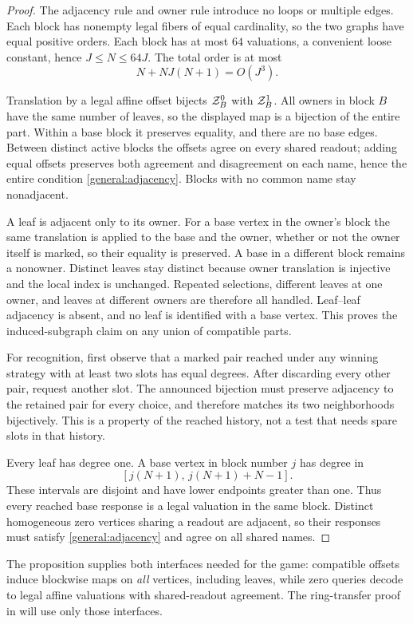 \begin{proof}
The adjacency rule and owner rule introduce no loops or multiple
edges. Each block has nonempty legal fibers of equal cardinality,
so the two graphs have equal positive orders. Each block has at
most \(64\) valuations, a convenient loose constant, hence
\(J\le N\le64J\). The total order is at most
\[
       N+NJ(N+1)=O(J^3).
\]

Translation by a legal affine offset bijects \(\mathcal Z_B^0\) with
\(\mathcal Z_B^1\). All owners in block \(B\) have the same number of
leaves, so the displayed map is a bijection of the entire part.
Within a base block it preserves equality, and there are no base
edges. Between distinct active blocks the offsets agree on every
shared readout; adding equal offsets preserves both agreement and
disagreement on each name, hence the entire condition
\eqref{general:adjacency}. Blocks with no common name stay
nonadjacent.

A leaf is adjacent only to its owner. For a base vertex in the
owner's block the same translation is applied to the base and the
owner, whether or not the owner itself is marked, so their equality
is preserved. A base in a different block remains a nonowner.
Distinct leaves stay distinct because owner translation is
injective and the local index is unchanged. Repeated selections,
different leaves at one owner, and leaves at different owners are
therefore all handled. Leaf--leaf adjacency is absent, and no leaf
is identified with a base vertex. This proves the induced-subgraph
claim on any union of compatible parts.

For recognition, first observe that a marked pair reached under
any winning strategy with at least two slots has equal degrees.
After discarding every other pair, request another slot. The
announced bijection must preserve adjacency to the retained pair
for every choice, and therefore matches its two neighborhoods
bijectively. This is a property of the reached history, not a test
that needs spare slots in that history.

Every leaf has degree one. A base vertex in block number \(j\)
has degree in
\[
       [j(N+1),\,j(N+1)+N-1].
\]
These intervals are disjoint and have lower endpoints greater
than one. Thus every reached base response is a legal valuation
in the same block. Distinct homogeneous zero vertices sharing
a readout are adjacent, so their responses must satisfy
\eqref{general:adjacency} and agree on all shared names.
\end{proof}

The proposition supplies both interfaces needed for the game:
compatible offsets induce blockwise maps on \emph{all} vertices,
including leaves, while zero queries decode to legal affine
valuations with shared-readout agreement. The ring-transfer proof
in  will use only those interfaces.
